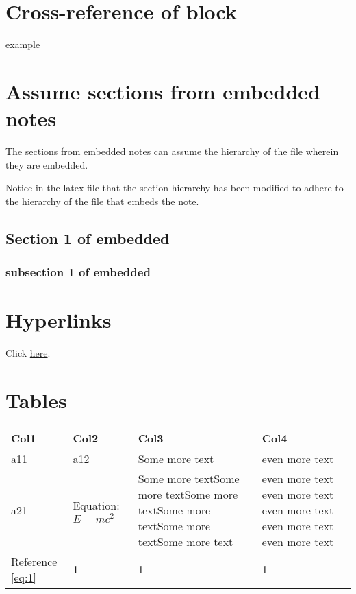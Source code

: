 \documentclass{article}
\begin{document}
\section{\maltese Cross-reference of block}

example



\section{Assume sections from embedded notes}

The sections from embedded notes can assume the hierarchy of the file wherein they are embedded.

\begin{tcolorbox}[width=\textwidth,colback={white},title={note},outer arc=0mm,colupper=black]

Notice in the latex file that the section hierarchy has been modified to adhere to the hierarchy of the file that embeds the note.

\end{tcolorbox}




\subsection{Section 1 of embedded}
\subsubsection{subsection 1 of embedded}




\section{Hyperlinks}

Click \href{https://www.youtube.com/}{here}.





\section{Tables}



\renewcommand\tabularxcolumn[1]{m{#1}}
\begin{center}
\begin{tabularx}{\textwidth}{|Y|Y|Y|Y|}
   \hline
    \textbf{Col1} & \textbf{Col2} & \textbf{Col3} & \textbf{Col4} \\ \hline
    a11 & a12 & Some more text & even more text \\ \hline
    a21 & Equation: $E=mc^{2}$ & Some more textSome more textSome more textSome more textSome more textSome more text & even more text even more text even more text even more text even more text \\ \hline
    Reference \cref{eq:1} & 1 & 1 & 1 \\ \hline
   \hline
\end{tabularx}
\end{center}
\newpage 
 

\end{document}
